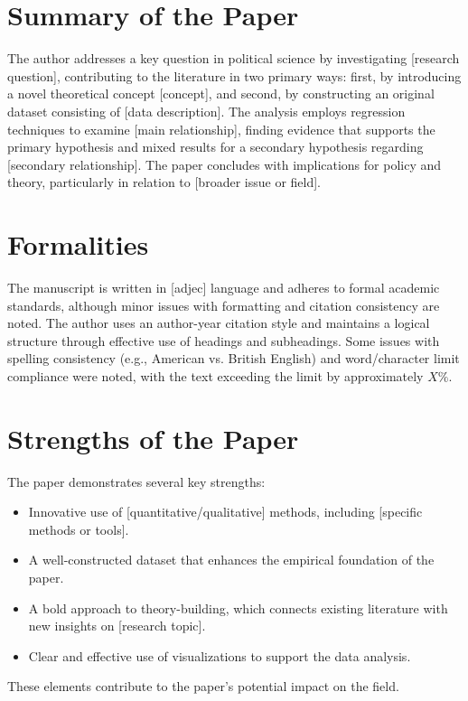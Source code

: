 \documentclass[11pt,a4paper]{article}
\begin{document}
\begin{multicols}{2}
\section{Summary of the Paper}
The author addresses a key question in political science by investigating [research question], contributing to the literature in two primary ways: first, by introducing a novel theoretical concept [concept], and second, by constructing an original dataset consisting of [data description]. The analysis employs regression techniques to examine [main relationship], finding evidence that supports the primary hypothesis and mixed results for a secondary hypothesis regarding [secondary relationship]. The paper concludes with implications for policy and theory, particularly in relation to [broader issue or field].

\section{Formalities}
The manuscript is written in [adjec] language and adheres to formal academic standards, although minor issues with formatting and citation consistency are noted. The author uses an author-year citation style and maintains a logical structure through effective use of headings and subheadings. Some issues with spelling consistency (e.g., American vs. British English) and word/character limit compliance were noted, with the text exceeding the limit by approximately $X\%$.

\section{Strengths of the Paper}
The paper demonstrates several key strengths:
\begin{itemize}
    \item Innovative use of [quantitative/qualitative] methods, including [specific methods or tools].
    \item A well-constructed dataset that enhances the empirical foundation of the paper.
    \item A bold approach to theory-building, which connects existing literature with new insights on [research topic].
    \item Clear and effective use of visualizations to support the data analysis.
\end{itemize}
These elements contribute to the paper's potential impact on the field.


\end{multicols}
\end{document}
